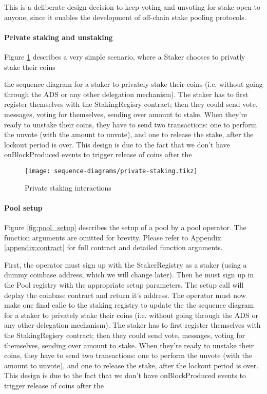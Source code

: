 This is a deliberate design decision to keep voting and unvoting for stake open to anyone, since it enables the development of off-chain stake pooling protocols. 

\paragraph{Private staking and unstaking}
Figure \ref{fig:priv_staking} describes a very simple scenario, where a Staker chooses to privatly stake their coins 

the sequence diagram for a staker to privately stake their coins (i.e. without going through the ADS or any other delegation mechanism).  The staker has to first register themselves with the StakingRegisry contract; then they could send vote, messages, voting for themselves, sending over amount to stake. When they're ready to unstake their coins, they have to send two transactions: one to perform the unvote (with the amount to unvote), and one to release the stake, after the lockout period is over. This design is due to the fact that we don't have onBlockProduced events to trigger release of coins after the 

\begin{figure}[ht]
\centering
\texttt{[image: sequence-diagrams/private-staking.tikz]}
\caption{Private staking interactions}
\label{fig:priv_staking}
\end{figure}

\paragraph{Pool setup}
Figure \ref{fig:pool_setup} describes the setup of a pool by a pool operator. The function arguments are omitted for brevity. Please refer to Appendix \ref{appendix:contract} for full contract and detailed function arguments. 

First, the operator must sign up with the StakerRegistry as a staker (using a dummy coinbase address, which we will change later). Then he must sign up in the Pool registry with  the appropriate setup parameters. The setup call will deplay the coinbase contract and return it's address. The operator must now make one final calle to the staking registry to update the  
the sequence diagram for a staker to privately stake their coins (i.e. without going through the ADS or any other delegation mechanism).  The staker has to first register themselves with the StakingRegisry contract; then they could send vote, messages, voting for themselves, sending over amount to stake. When they're ready to unstake their coins, they have to send two transactions: one to perform the unvote (with the amount to unvote), and one to release the stake, after the lockout period is over. This design is due to the fact that we don't have onBlockProduced events to trigger release of coins after the 

